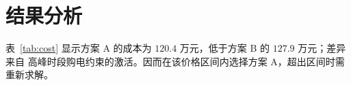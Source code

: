 \section{结果分析}
表~\ref{tab:cost} 显示方案 A 的成本为 $120.4$ 万元，低于方案 B 的 $127.9$ 万元；差异来自
高峰时段购电约束的激活。因而在该价格区间内选择方案 A，超出区间时需重新求解。
